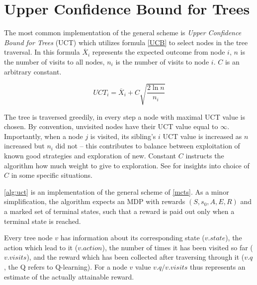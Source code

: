 \pagebreak


\section{Upper Confidence Bound for Trees}

The most common implementation of the general scheme is {\em Upper
Confidence Bound for Trees} (UCT) which utilizes formula \ref{UCB} to
select nodes in the tree traversal.
In this formula $\overline{X}_i$ represents the expected outcome
from node $i$, $n$ is the number of visits to all nodes, $n_i$ is the
number of visits to node $i$. $C$ is an arbitrary constant.

\begin{equation}
\label{UCB}
UCT_i = \overline{X}_i + C \sqrt{ \frac{2 \ln n}{n_i} }
\end{equation}

The tree is traversed greedily, in every step a node with maximal UCT
value is chosen. By convention, unvisited nodes have their UCT value
equal to $\infty$.  Importantly, when a node $j$ is visited, its
sibling's $i$ UCT value is increased as $n$ increased but $n_i$ did not
-- this contributes to balance between exploitation of known good
strategies and exploration of new.  Constant $C$ instructs the algorithm
how much weight to give to exploration. See \parencite{improved_mc} for
insights into choice of $C$ in some specific situations.

\autoref{alg:uct} is an implementation of the general scheme of \autoref{mcts}.
As a minor simplification, the algorithm expects an MDP with rewards
$(S,s_0,A,E,R)$ and a marked set of terminal states, such that a reward
is paid out only when a terminal state is reached.

Every tree node $v$ has information about its corresponding state
($v.state$), the action which lead to it ($v.action$), the number of
times it has been visited so far ($v.visits$), and the reward which has
been collected after traversing through it ($v.q$, the Q refers to
Q-learning). For a node $v$ value $v.q / v.visits$ thus represents an
estimate of the actually attainable reward.

